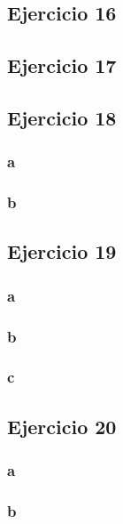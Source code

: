\documentclass{article}
\begin{document}
\subsection*{Ejercicio 16}

\subsection*{Ejercicio 17}

\subsection*{Ejercicio 18}

\subsubsection*{a}

\subsubsection*{b}

\subsection*{Ejercicio 19}

\subsubsection*{a}

\subsubsection*{b}

\subsubsection*{c}

\subsection*{Ejercicio 20}

\subsubsection*{a}

\subsubsection*{b}
\end{document}
